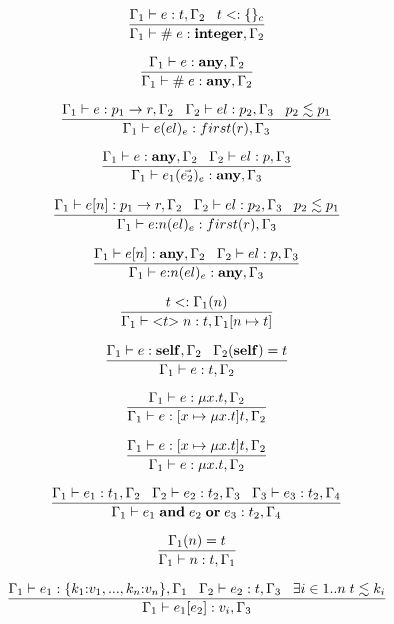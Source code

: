 \[
\dfrac{\Gamma_{1} \vdash e:t, \Gamma_{2} \;\;\;
       t <: \{\}_{c}}
      {\Gamma_{1} \vdash \# \; e:\mathbf{integer}, \Gamma_{2}}
\]

\[
\dfrac{\Gamma_{1} \vdash e:\mathbf{any}, \Gamma_{2}}
      {\Gamma_{1} \vdash \# \; e:\mathbf{any}, \Gamma_{2}}
\]

\[
\dfrac{\Gamma_{1} \vdash e:p_{1} \rightarrow r, \Gamma_{2} \;\;\;
       \Gamma_{2} \vdash el:p_{2}, \Gamma_{3} \;\;\;
       p_{2} \lesssim p_{1}}
      {\Gamma_{1} \vdash e(el)_{e}:first(r), \Gamma_{3}}
\]

\[
\dfrac{\Gamma_{1} \vdash e:\mathbf{any}, \Gamma_{2} \;\;\;
       \Gamma_{2} \vdash el:p, \Gamma_{3}}
      {\Gamma_{1} \vdash e_{1}(\vec{e_{2}})_{e}:\mathbf{any}, \Gamma_{3}}
\]

\[
\dfrac{\Gamma_{1} \vdash e[n]:p_{1} \rightarrow r, \Gamma_{2} \;\;\;
       \Gamma_{2} \vdash el:p_{2}, \Gamma_{3} \;\;\;
       p_{2} \lesssim p_{1}}
      {\Gamma_{1} \vdash e{:}n(el)_{e}:first(r), \Gamma_{3}}
\]

\[
\dfrac{\Gamma_{1} \vdash e[n]:\mathbf{any}, \Gamma_{2} \;\;\;
       \Gamma_{2} \vdash el:p, \Gamma_{3}}
      {\Gamma_{1} \vdash e{:}n(el)_{e}:\mathbf{any}, \Gamma_{3}}
\]

\[
\dfrac{t <: \Gamma_{1}(n)}
      {\Gamma_{1} \vdash {<}t{>} \; n:t, \Gamma_{1}[n \mapsto t]}
\]

\[
\dfrac{\Gamma_{1} \vdash e:\mathbf{self}, \Gamma_{2} \;\;\;
       \Gamma_{2}(\mathbf{self}) = t}
      {\Gamma_{1} \vdash e:t, \Gamma_{2}}
\]

\[
\dfrac{\Gamma_{1} \vdash e:\mu x.t, \Gamma_{2}}
      {\Gamma_{1} \vdash e:[x \mapsto \mu x.t]t, \Gamma_{2}}
\]

\[
\dfrac{\Gamma_{1} \vdash e:[x \mapsto \mu x.t]t, \Gamma_{2}}
      {\Gamma_{1} \vdash e:\mu x.t, \Gamma_{2}}
\]

\[
\dfrac{\Gamma_{1} \vdash e_{1}:t_{1}, \Gamma_{2} \;\;\;
       \Gamma_{2} \vdash e_{2}:t_{2}, \Gamma_{3} \;\;\;
       \Gamma_{3} \vdash e_{3}:t_{2}, \Gamma_{4}}
      {\Gamma_{1} \vdash e_{1} \; \mathbf{and} \; e_{2} \; \mathbf{or} \; e_{3}:t_{2}, \Gamma_{4}}
\]

\[
\dfrac{\Gamma_{1}(n) = t}
      {\Gamma_{1} \vdash n:t, \Gamma_{1}}
\]

\[
\dfrac{\Gamma_{1} \vdash e_{1}:\{k_{1}{:}v_{1}, ..., k_{n}{:}v_{n}\}, \Gamma_{1} \;\;\;
       \Gamma_{2} \vdash e_{2}:t, \Gamma_{3} \;\;\;
       \exists i \in 1{..}n \; t \lesssim k_{i}}
      {\Gamma_{1} \vdash e_{1}[e_{2}]:v_{i}, \Gamma_{3}}
\]

